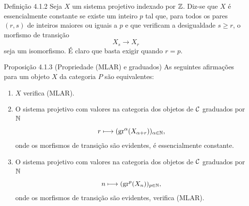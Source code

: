 \begin{statement}{Definição 4.1.2}
Seja $X$ um sistema projetivo indexado por $\mathbb Z$. Diz-se que $X$ é essencialmente constante se existe um inteiro $p$ tal que, para todos os pares $(r,s)$ de inteiros maiores ou iguais a $p$ e que verificam a desigualdade $s\ge r$, o morfismo de transição
\[
X_s\longrightarrow X_r
\]
seja um isomorfismo. É claro que basta exigir quando $r=p$.
\end{statement}

\begin{statement}{Proposição 4.1.3 (Propriedade (MLAR) e graduados)}
As seguintes afirmações para um objeto $X$ da categoria $P$ são equivalentes:
\begin{enumerate}[label=(\roman*)]
\item $X$ verifica (MLAR).
\item O sistema projetivo com valores na categoria dos objetos de $\mathcal C$ graduados por $\mathbb N$
\[
r\longmapsto (\operatorname{gr}^\alpha(X_{\alpha+r}))_{\alpha\in\mathbb N},
\]
onde os morfismos de transição são evidentes, é essencialmente constante.
\item O sistema projetivo com valores na categoria dos objetos de $\mathcal C$ graduados por $\mathbb N$
\[
n\longmapsto (\operatorname{gr}^p(X_n))_{p\in\mathbb N},
\]
onde os morfismos de transição são evidentes, verifica (MLAR).
\end{enumerate}
\end{statement}

